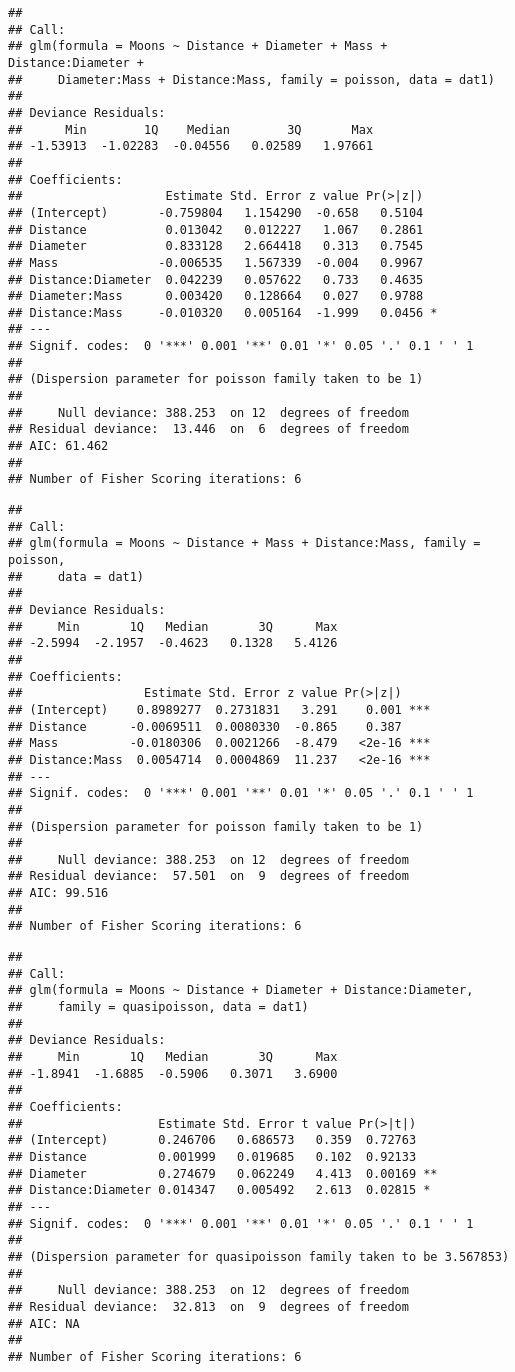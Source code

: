 \documentclass[]{article}
\begin{document}
\begin{verbatim}
## 
## Call:
## glm(formula = Moons ~ Distance + Diameter + Mass + Distance:Diameter + 
##     Diameter:Mass + Distance:Mass, family = poisson, data = dat1)
## 
## Deviance Residuals: 
##      Min        1Q    Median        3Q       Max  
## -1.53913  -1.02283  -0.04556   0.02589   1.97661  
## 
## Coefficients:
##                    Estimate Std. Error z value Pr(>|z|)  
## (Intercept)       -0.759804   1.154290  -0.658   0.5104  
## Distance           0.013042   0.012227   1.067   0.2861  
## Diameter           0.833128   2.664418   0.313   0.7545  
## Mass              -0.006535   1.567339  -0.004   0.9967  
## Distance:Diameter  0.042239   0.057622   0.733   0.4635  
## Diameter:Mass      0.003420   0.128664   0.027   0.9788  
## Distance:Mass     -0.010320   0.005164  -1.999   0.0456 *
## ---
## Signif. codes:  0 '***' 0.001 '**' 0.01 '*' 0.05 '.' 0.1 ' ' 1
## 
## (Dispersion parameter for poisson family taken to be 1)
## 
##     Null deviance: 388.253  on 12  degrees of freedom
## Residual deviance:  13.446  on  6  degrees of freedom
## AIC: 61.462
## 
## Number of Fisher Scoring iterations: 6
\end{verbatim}

\begin{verbatim}
## 
## Call:
## glm(formula = Moons ~ Distance + Mass + Distance:Mass, family = poisson, 
##     data = dat1)
## 
## Deviance Residuals: 
##     Min       1Q   Median       3Q      Max  
## -2.5994  -2.1957  -0.4623   0.1328   5.4126  
## 
## Coefficients:
##                 Estimate Std. Error z value Pr(>|z|)    
## (Intercept)    0.8989277  0.2731831   3.291    0.001 ***
## Distance      -0.0069511  0.0080330  -0.865    0.387    
## Mass          -0.0180306  0.0021266  -8.479   <2e-16 ***
## Distance:Mass  0.0054714  0.0004869  11.237   <2e-16 ***
## ---
## Signif. codes:  0 '***' 0.001 '**' 0.01 '*' 0.05 '.' 0.1 ' ' 1
## 
## (Dispersion parameter for poisson family taken to be 1)
## 
##     Null deviance: 388.253  on 12  degrees of freedom
## Residual deviance:  57.501  on  9  degrees of freedom
## AIC: 99.516
## 
## Number of Fisher Scoring iterations: 6
\end{verbatim}

\begin{verbatim}
## 
## Call:
## glm(formula = Moons ~ Distance + Diameter + Distance:Diameter, 
##     family = quasipoisson, data = dat1)
## 
## Deviance Residuals: 
##     Min       1Q   Median       3Q      Max  
## -1.8941  -1.6885  -0.5906   0.3071   3.6900  
## 
## Coefficients:
##                   Estimate Std. Error t value Pr(>|t|)   
## (Intercept)       0.246706   0.686573   0.359  0.72763   
## Distance          0.001999   0.019685   0.102  0.92133   
## Diameter          0.274679   0.062249   4.413  0.00169 **
## Distance:Diameter 0.014347   0.005492   2.613  0.02815 * 
## ---
## Signif. codes:  0 '***' 0.001 '**' 0.01 '*' 0.05 '.' 0.1 ' ' 1
## 
## (Dispersion parameter for quasipoisson family taken to be 3.567853)
## 
##     Null deviance: 388.253  on 12  degrees of freedom
## Residual deviance:  32.813  on  9  degrees of freedom
## AIC: NA
## 
## Number of Fisher Scoring iterations: 6
\end{verbatim}
\end{document}
